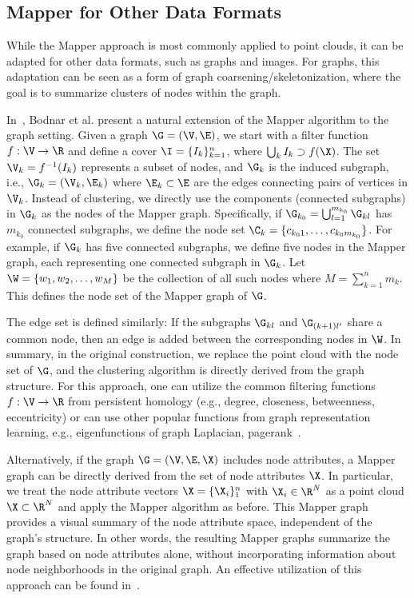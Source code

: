 \subsection{Mapper for Other Data Formats}  \label{sec:mapper-graph}
 

While the Mapper approach is most commonly applied to point clouds, it can be adapted for other data formats, such as graphs and images. For graphs, this adaptation can be seen as a form of graph coarsening/skeletonization, where the goal is to summarize clusters of nodes within the graph.

In~\cite{bodnar2021deep,hajij2018mog}, Bodnar et al. present a natural extension of the Mapper algorithm to the graph setting. Given a graph $\G=(\V,\E)$, we start with a filter function $f:\V\to\R$ and define a cover $\I = \{I_k\}_{k=1}^{n}$, where $\bigcup_k I_k \supset f(\X)$. The set $\V_k = f^{-1}(I_k)$ represents a subset of nodes, and $\G_k$ is the induced subgraph, i.e., $\G_k = (\V_k,\E_k)$ where $\E_k \subset \E$ are the edges connecting pairs of vertices in $\V_k$. Instead of clustering, we directly use the components (connected subgraphs) in $\G_k$ as the nodes of the Mapper graph.
Specifically, if $\G_{k_0} = \bigcup_{l=1}^{m_{k_0}} \G_{kl}$ has $m_{k_0}$ connected subgraphs, we define the node set $\C_k = \{c_{k_01}, \dots, c_{k_0m_{k_0}}\}$. For example, if $\G_k$ has five connected subgraphs, we define five nodes in the Mapper graph, each representing one connected subgraph in $\G_k$. Let $\W = \{w_1, w_2, \dots, w_M\}$ be the collection of all such nodes where $M = \sum_{k=1}^{n} m_k$. This defines the node set of the Mapper graph of $\G$. 

The edge set is defined similarly: If the subgraphs $\G_{kl}$ and $\G_{(k+1) l'}$ share a common node, then an edge is added between the corresponding nodes in $\W$. In summary, in the original construction, we replace the point cloud with the node set of $\G$, and the clustering algorithm is directly derived from the graph structure.  For this approach, one can utilize the common filtering functions $f:\V\to\R$ from persistent homology (e.g., degree, closeness, betweenness, eccentricity) or can use other popular functions from graph representation learning, e.g., eigenfunctions of graph Laplacian, pagerank~\cite{hajij2018mog}. 


 
Alternatively, if the graph \(\G = (\V, \E, \X)\) includes node attributes, a Mapper graph can be directly derived from the set of node attributes \(\X\). In particular, we treat the node attribute vectors \(\X = \{\X_i\}_1^n\) with \(\X_i \in \R^N\) as a point cloud \(\X \subset \R^N\) and apply the Mapper algorithm as before. This Mapper graph provides a visual summary of the node attribute space, independent of the graph's structure. In other words, the resulting Mapper graphs summarize the graph based on node attributes alone, without incorporating information about node neighborhoods in the original graph. An effective utilization of this approach can be found in~\cite{shamsi2024graphpulse}.


